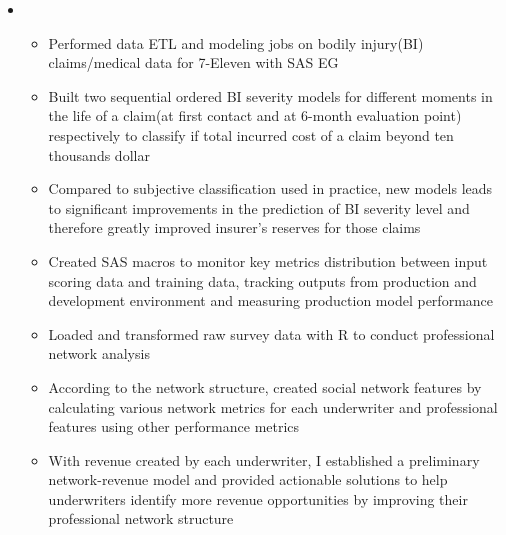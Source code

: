 \documentclass[11pt,a4paper,sans]{moderncv}        %
\begin{document}
\begin{itemize}
	\item{
		{\vspace{3pt}
			\begin{itemize}
				\item Performed data ETL and modeling jobs on bodily injury(BI) claims/medical data for 7-Eleven with SAS EG
				\item Built two sequential ordered BI severity models for different moments in the life of a claim(at first contact and at 6-month evaluation point) respectively to classify if total incurred cost of a claim beyond ten thousands dollar 
				\item Compared to subjective classification used in practice, new models leads to significant improvements in the prediction of BI severity level and therefore greatly improved insurer's reserves for those claims
				\item Created SAS macros to monitor key metrics distribution between input scoring data and training data, tracking outputs from production and development environment and measuring production model performance 
				\item  Loaded and transformed raw survey data with R to conduct professional network analysis 
				\item According to the network structure, created social network features by calculating various network metrics for each underwriter and professional features using other performance metrics
				\item With revenue created by each underwriter, I established a preliminary network-revenue model and provided actionable solutions to help underwriters identify more revenue opportunities by improving their professional network structure 
		    \end{itemize}}}


\end{itemize}
\end{document}
